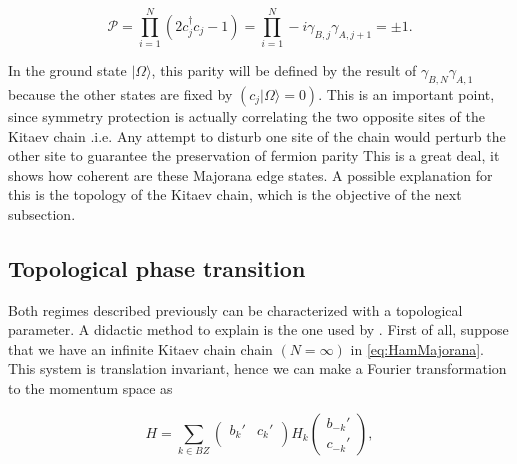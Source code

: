 \begin{equation}
    \mathcal{P} =\prod_{i = 1}^N\left(  2c^\dagger_jc_j-1 \right) = \prod_{i = 1}^N -i\gamma_{B,j}\gamma_{A,j+1}= \pm 1. 
\end{equation}

In the ground state $\vert \Omega \rangle$, this parity will be  defined by the result of  $\gamma_{B,N}\gamma_{A,1}$ because the other states are fixed by $(c_j\vert \Omega \rangle = 0)$. This is an important point, since  symmetry protection is actually correlating the two opposite sites of the Kitaev chain .i.e. Any attempt to disturb one site of the chain would perturb the other site to guarantee the preservation of fermion parity  This is a great deal,  it shows how coherent are these Majorana edge states. A possible explanation for this is the topology of the Kitaev chain, which is the objective of the next subsection.




\subsection{Topological phase transition \label{subsec:top}}

Both regimes described previously  can be characterized with a topological parameter.  A didactic method to explain is the one used by \citeauthor{alicea_new_2012}\cite{alicea_new_2012}. First of all, suppose that we have an infinite Kitaev chain chain $(N=\infty)$ in  \eqref{eq:HamMajorana}. This system is translation invariant, hence we can make a Fourier transformation to the momentum space as

\begin{equation}
    H = 
    \sum_{k \in BZ} 
    \begin{pmatrix} 
      b_k'  & c_{k}'\\  
    \end{pmatrix}
    H_k 
    \begin{pmatrix} 
      b_{-k}'     \\ 
      c_{-k}' 
    \end{pmatrix},
    \label{PBCHam2}
\end{equation}

